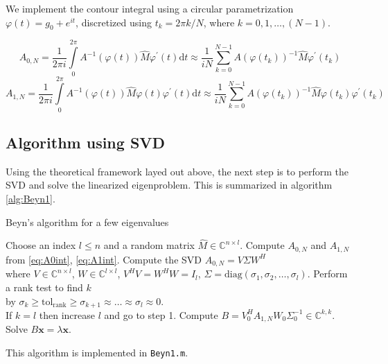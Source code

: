 \documentclass[11pt,letterpaper]{article}
\newcommand{\diff}{\mathrm{d}}
\begin{document}
We implement the contour integral using a circular parametrization $\varphi(t) = g_0 + e^{i t}$, discretized using $t_k = 2\pi k/N$, where $k=0,1,\ldots,(N-1)$. 

\begin{equation}\label{eq:A0int}
A_{0,N} = \frac{1}{2\pi i}\int\limits_{0}^{2\pi} A^{-1}(\varphi(t))\hat{M} \varphi^{\prime}(t)\diff t 
\approx \frac{1}{iN}\sum\limits_{k=0}^{N-1}A(\varphi(t_k))^{-1}\hat{M}\varphi^{\prime}(t_k)
\end{equation}
\begin{equation}\label{eq:A1int}
A_{1,N} = \frac{1}{2\pi i}\int\limits_{0}^{2\pi} A^{-1}(\varphi(t))\hat{M} \varphi(t) \varphi^{\prime}(t)\diff t
\approx \frac{1}{iN}\sum\limits_{k=0}^{N-1}A(\varphi(t_k))^{-1}\hat{M} \varphi(t_k) \varphi^{\prime}(t_k)
\end{equation}

\subsection{Algorithm using SVD}
Using the theoretical framework layed out above, the next step is to perform the SVD and solve the linearized eigenproblem. This is summarized in algorithm \ref{alg:Beyn1}. 

\begin{algorithm}
\caption{Beyn's algorithm for a few eigenvalues}
\label{alg:Beyn1}
\begin{algorithmic}
\REQUIRE Choose an index $l\leq n$ and a random matrix $\hat{M}\in\mathbb{C}^{n\times l}$. 
\STATE Compute $A_{0,N}$ and $A_{1,N}$ from \ref{eq:A0int}, \ref{eq:A1int}. 
\STATE Compute the SVD $A_{0,N} = V\Sigma W^{H}$ 
\\ \hspace{0.5cm} where $V\in\mathbb{C}^{n\times l}$, $W\in\mathbb{C}^{l\times l}$, $V^{H}V=W^{H}W = I_{l}$, $\Sigma = \mathrm{diag}(\sigma_1,\sigma_2,\ldots,\sigma_l)$.
\STATE Perform a rank test to find $k$ 
\\ \hspace{0.5cm} by $\sigma_k \geq \mathrm{tol_{rank}}\geq \sigma_{k+1} \approx \ldots \approx \sigma_l \approx 0$. 
\\ \hspace{0.5cm} If $k = l$ then increase $l$ and go to step 1. 
\STATE Compute $B = V_0^H A_{1,N} W_0 \Sigma_0^{-1} \in \mathbb{C}^{k,k}$.
\STATE Solve $B\mathbf{x} =\lambda\mathbf{x}$.
\end{algorithmic}
\end{algorithm}
This algorithm is implemented in {\tt Beyn1.m}. 
\end{document}
